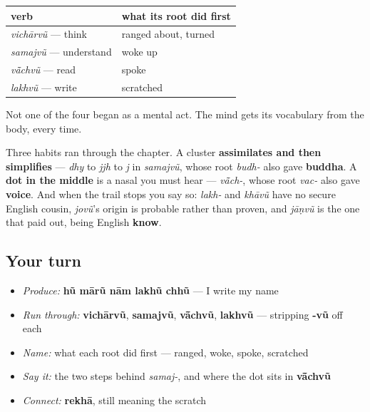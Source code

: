 \begin{grammarlens}[title={What you've built: four verbs, and what each root did first}]
\noindent
\begin{tabularx}{\linewidth}{@{}>{\raggedright\arraybackslash}X>{\raggedright\arraybackslash}X@{}}
\toprule
\textbf{verb} & \textbf{what its root did first} \\
\midrule
\emph{vichārvũ} — think & ranged about, turned \\
\emph{samajvũ} — understand & woke up \\
\emph{vā̃chvũ} — read & spoke \\
\emph{lakhvũ} — write & scratched \\
\bottomrule
\end{tabularx}

Not one of the four began as a mental act. The mind gets its vocabulary from the body, every time.

Three habits ran through the chapter. A cluster \textbf{assimilates and then simplifies} — \emph{dhy} to \emph{jjh} to \emph{j} in \emph{samajvũ}, whose root \emph{budh-} also gave \textbf{buddha}. A \textbf{dot in the middle} is a nasal you must hear — \emph{vā̃ch-}, whose root \emph{vac-} also gave \textbf{voice}. And when the trail stops you say so: \emph{lakh-} and \emph{khāvũ} have no secure English cousin, \emph{jovũ}'s origin is probable rather than proven, and \emph{jāṇvũ} is the one that paid out, being English \textbf{know}.
\end{grammarlens}

\subsection*{Your turn}
\begin{itemize}
\raggedright
  \item \emph{Produce:} \textbf{hũ mārũ nām lakhũ chhũ} — I write my name
  \item \emph{Run through:} \textbf{vichārvũ}, \textbf{samajvũ}, \textbf{vā̃chvũ}, \textbf{lakhvũ} — stripping \textbf{-vũ} off each
  \item \emph{Name:} what each root did first — ranged, woke, spoke, scratched
  \item \emph{Say it:} the two steps behind \emph{samaj-}, and where the dot sits in \textbf{vā̃chvũ}
  \item \emph{Connect:} \textbf{rekhā}, still meaning the scratch
\end{itemize}


